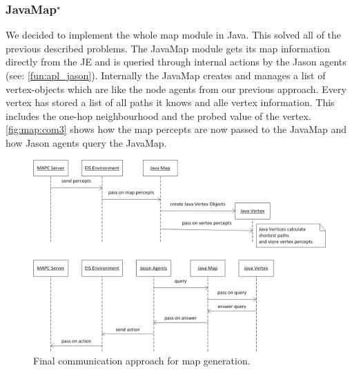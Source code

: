 \subsubsection[JavaMap]{JavaMap$^\star$}\label{alg:map_javamap}
We decided to implement the whole map module in Java.
This solved all of the previous described problems.
The JavaMap module gets its map information directly from the JE and is queried through internal actions by the Jason agents (see: \autoref{fun:apl_jason}).
Internally the JavaMap creates and manages a list of vertex-objects which are like the node agents from our previous approach.
Every vertex has stored a list of all paths it knows and alle vertex information.
This includes the one-hop neighbourhood and the probed value of the vertex.
\autoref{fig:map:com3} shows how the map percepts are now passed to the JavaMap and how Jason agents query the JavaMap.
\begin{figure}
  \centering
  \includegraphics[width=\linewidth]{images/map_com_3.png}
  \caption{Final communication approach for map generation.}
  \label{fig:map:com3}
\end{figure}

